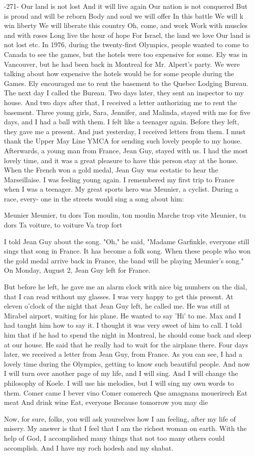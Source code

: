 -271- 
Our land is not lost 
And it will live again 
Our nation is not conquered 
But is proud and will be reborn 
Body and soul we will offer 
In this battle 
We will k win liberty 
We will liberate this country 
Oh, come, and work 
Work with muscles and with roses 
Long live the hour of hope 
For Israel, the land we love 
Our land is not lost 
etc. 
In 1976, during the twenty-first Olympics, people wanted 
to come to Canada to see the games, but the hotels were too expensive 
for some. Ely was in Vancouver, but he had been back in Montreal 
for Mr. Alpert's party. We were talking about how expensive the 
hotels would be for some people during the Games. Ely encouraged 
me to rent the basement to the Quebec Lodging Bureau. 
The next day I called the Bureau. Two days later, they sent 
an inspector to my house. And two days after that, I received a 
letter authorizing me to rent the basement. 
Three young girls, Sara, Jennifer, and Malinda, stayed with me 
for five days, and I had a ball with them. I felt like a teenager 
again. Before they left, they gave me a present. And just yesterday, I received letters from them. I must thank the Upper May Line 
YMCA for sending such lovely people to my house. 
Afterwards, a young man from France, Jean Guy, stayed with us. 
I had the most lovely time, and it was a great pleasure to have this 
person stay at the house. When the French won a gold medal, Jean 
Guy was ecstatic to hear the Marseillaise. I was feeling young again. I remembered my first trip to France when I was a teenager. 
My great sports hero was Meunier, a cyclist. During a race, every-
one in the streets would sing a song about him: 

Meunier 
Meunier, tu dors 
Ton moulin, ton moulin 
Marche trop vite 
Meunier, tu dors 
Ta voiture, to voiture 
Va trop fort 

I told Jean Guy about the song. 
"Oh," he said, "Madame Garfinkle, everyone still sings that 
song in France. It has become a folk song. When these people who 
won the gold medal arrive back in France, the band will be playing 
Meunier's song." 
On Monday, August 2, Jean Guy left for France. 

But before he left, he gave me an alarm clock with nice big numbers on the dial, that I can read without my glasses. I was very 
happy to get this present.
At eleven o'clock of the night that Jean Guy left, he called 
me. He was still at Mirabel airport, waiting for his plane. He 
wanted to say 'Hi' to me. Max and I had taught him how to say it. 
I thought it was very sweet of him to call. I told him that if he 
had to spend the night in Montreal, he should come back and sleep 
at our house. He said that he really had to wait for the airplane
there. Four days later, we received a letter from Jean Guy, from 
France. As you can see, I had a lovely time during the Olympics, 
getting to know such beautiful people. 
And now I will turn over another page of my life, and I will 
sing. And I will change the philosophy of Koele. I will use his 
melodies, but I will sing my own words to them. 
Comer came 
I bever vino 
Comer comerech 
Que amagnana mouerirech 
Eat meat 
And drink wine 
Eat, everyone 
Because tomorrow you may die 

Now, for sure, folks, you will ask yourselves how I am feeling, 
after my life of misery. My answer is that I feel that I am the richest woman on earth. With the help of God, I accomplished many 
things that not too many others could accomplish. And I have my 
roch hodesh and my shabat. 

